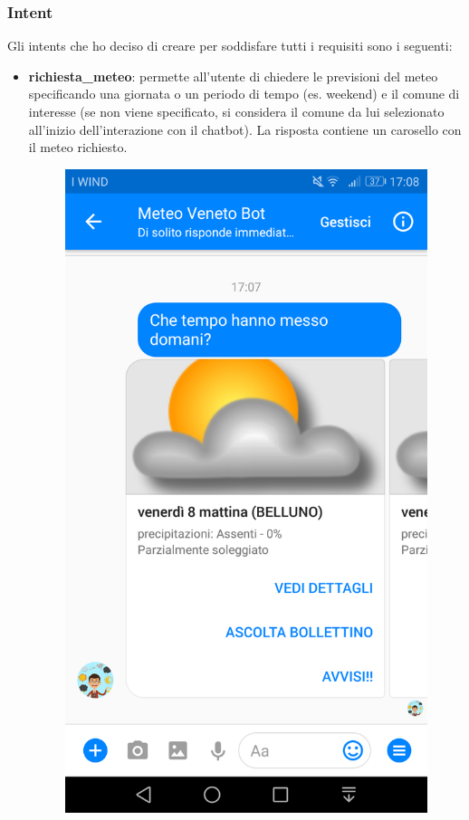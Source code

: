 \subsubsection{Intent}
Gli intents che ho deciso di creare per soddisfare tutti i requisiti sono i seguenti:
\begin{itemize}
	\item \textbf{richiesta\_meteo}: permette all'utente di chiedere le previsioni del meteo specificando una giornata o un periodo di tempo (es. weekend) e il comune di interesse (se non viene specificato, si considera il comune da lui selezionato all'inizio dell'interazione con il \gls{chatbot}). La risposta contiene un carosello con il meteo richiesto.
	\begin{figure}[h!]
		\centering
		\includegraphics[scale=0.12]{../Immagini/richiesta_meteo.png}

\end{figure}
\end{itemize}
